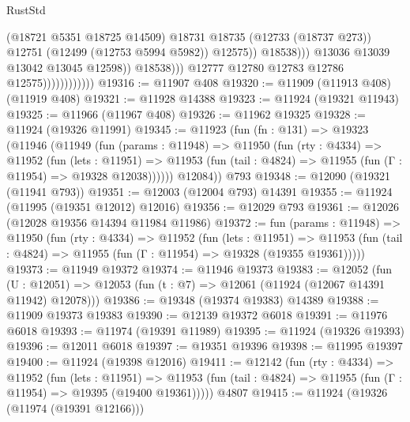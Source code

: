 \begin{lexlean}{RustStd}
\begin{coremodule}
{\begin{coremodule}
{{{{{{{{{{{{{{{{{{{{{{{{{{{{{{{{{{{{{{{{{{{{{{{{{{{{{{{{{{{{{{{{{{{{{{{{{{{{{{{{                                                (@18721 @5351 @18725 @14509)
                                                @18731
                                                @18735
                                                (@12733 (@18737 @273))
                                                @12751
                                                (@12499 (@12753 @5994 @5982))
                                                @12575))
                                            @18538)))
                                      @13036
                                      @13039
                                      @13042
                                      @13045
                                      @12598))
                                  @18538)))
                            @12777
                            @12780
                            @12783
                            @12786
                            @12575))))))))))))
@19316 := @11907 @408
@19320 := @11909 (@11913 @408) (@11919 @408)
@19321 := @11928 @14388
@19323 := @11924 (@19321 @11943)
@19325 := @11966 (@11967 @408)
@19326 := @11962 @19325
@19328 := @11924 (@19326 @11991)
@19345 := @11923
    (fun (fn : @131) =>
    @19323
      (@11946
        (@11949
          (fun (params : @11948) =>
          @11950
            (fun (rty : @4334) =>
            @11952
              (fun (lets : @11951) =>
              @11953 (fun (tail : @4824) => @11955 (fun (Γ : @11954) => @19328 @12038))))))
        @12084))
    @793
@19348 := @12090 (@19321 (@11941 @793))
@19351 := @12003 (@12004 @793) @14391
@19355 := @11924 (@11995 (@19351 @12012) @12016)
@19356 := @12029 @793
@19361 := @12026 (@12028 @19356 @14394 @11984 @11986)
@19372 := fun (params : @11948) =>
  @11950
    (fun (rty : @4334) =>
    @11952
      (fun (lets : @11951) =>
      @11953 (fun (tail : @4824) => @11955 (fun (Γ : @11954) => @19328 (@19355 @19361)))))
@19373 := @11949 @19372
@19374 := @11946 @19373
@19383 := @12052
    (fun (U : @12051) => @12053 (fun (t : @7) => @12061 (@11924 (@12067 @14391 @11942) @12078)))
@19386 := @19348 (@19374 @19383) @14389
@19388 := @11909 @19373 @19383
@19390 := @12139 @19372 @6018
@19391 := @11976 @6018
@19393 := @11974 (@19391 @11989)
@19395 := @11924 (@19326 @19393)
@19396 := @12011 @6018
@19397 := @19351 @19396
@19398 := @11995 @19397
@19400 := @11924 (@19398 @12016)
@19411 := @12142
    (fun (rty : @4334) =>
    @11952
      (fun (lets : @11951) =>
      @11953 (fun (tail : @4824) => @11955 (fun (Γ : @11954) => @19395 (@19400 @19361)))))
    @4807
@19415 := @11924 (@19326 (@11974 (@19391 @12166)))
}}}}}}}}}}}}}}}}}}}}}}}}}}}}}}}}}}}}}}}}}}}}}}}}}}}}}}}}}}}}}}}}}}}}}}}}}}}}}}}}
\end{coremodule}}
\end{coremodule}
\end{lexlean}
